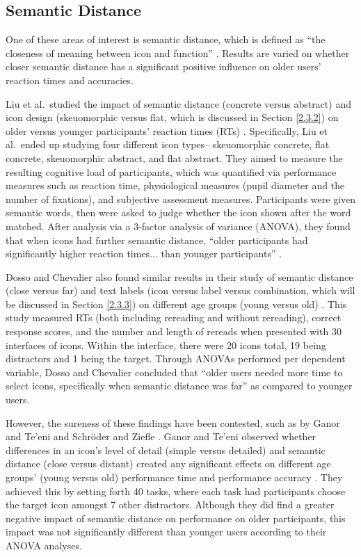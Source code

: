 \documentclass[12pt,twoside]{reedthesis}
\begin{document}
    \subsection{Semantic Distance}\label{2.3.1}
        One of these areas of interest is semantic distance, which is defined as \enquote{the closeness of meaning between icon and function} \cite{ganor_designing_nodate}. Results are varied on whether closer semantic distance has a significant positive influence on older users' reaction times and accuracies. 

        Liu et al.~studied the impact of semantic distance (concrete versus abstract) and icon design (skeuomorphic versus flat, which is discussed in Section \ref{2.3.2}) on older versus younger participants' reaction times (RTs) \cite{liu_study_2023}. Specifically, Liu et al.~ended up studying four different icon types-- skeuomorphic concrete, flat concrete, skeuomorphic abstract, and flat abstract. They aimed to measure the resulting cognitive load of participants, which was quantified via performance measures such as reaction time, physiological measures (pupil diameter and the number of fixations), and subjective assessment measures. Participants were given semantic words, then were asked to judge whether the icon shown after the word matched. After analysis via a 3-factor analysis of variance (ANOVA), they found that when icons had further semantic distance, \enquote{older participants had significantly higher reaction times... than younger participants} \cite{liu_study_2023}. 
        
        Dosso and Chevalier also found similar results in their study of semantic distance (close versus far) and text labels (icon versus label versus combination, which will be discussed in Section \ref{2.3.3}) on different age groups (young versus old) \cite{dosso_how_2021}. This study measured RTs (both including rereading and without rereading), correct response scores, and the number and length of rereads when presented with 30 interfaces of icons. Within the interface, there were 20 icons total, 19 being distractors and 1 being the target. Through ANOVAs performed per dependent variable, Dosso and Chevalier concluded that \enquote{older users needed more time to select icons, specifically when semantic distance was far} \cite{dosso_how_2021} as compared to younger users. 
        
        However, the sureness of these findings have been contested, such as by Ganor and Te'eni \cite{ganor_designing_nodate} and Schröder and Ziefle \cite{schroder_effects_2008}. Ganor and Te'eni observed whether differences in an icon's level of detail (simple versus detailed) and semantic distance (close versus distant) created any significant effects on different age groups' (young versus old) performance time and performance accuracy \cite{ganor_designing_nodate}. They achieved this by setting forth 40 tasks, where each task had participants choose the target icon amongst 7 other distractors. Although they did find a greater negative impact of semantic distance on performance on older participants, this impact was not significantly different than younger users according to their ANOVA analyses. 
        
\end{document}
